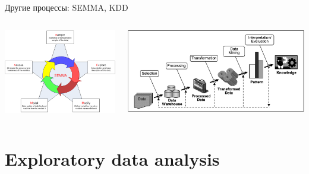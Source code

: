 \documentclass[10pt]{beamer}
\begin{document}
\begin{frame}{Другие процессы: SEMMA, KDD}

\begin{columns}[C]
    \begin{column}{.5\textwidth}
    	\includegraphics[width=\textwidth]{images/semma.png}
    \end{column}
       
    \begin{column}{.5\textwidth}
    \vspace{-0em}
	\begin{center}
   		\includegraphics[width=\textwidth]{images/kdd.png}
    \end{center}
    \end{column}
  \end{columns}

\end{frame}

\section{Exploratory data analysis}
\end{document}
